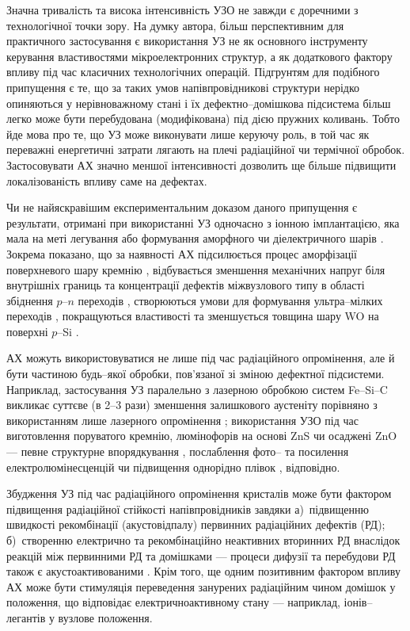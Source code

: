 Значна тривалість та висока інтенсивність УЗО не завжди є доречними з технологічної точки зору.
На думку автора, більш перспективним для практичного застосування є використання УЗ не як основного інструменту керування властивостями мікроелектронних структур, а як додаткового фактору впливу під час класичних технологічних операцій.
Підгрунтям для подібного припущення є те, що за таких умов напівпровідникові структури нерідко опиняються у нерівноважному стані і їх дефектно--домішкова підсистема більш легко може бути перебудована (модифікована) під дією пружних коливань.
Тобто йде мова про те, що УЗ може виконувати лише керуючу роль, в той час як переважні енергетичні затрати
лягають на плечі радіаційної чи термічної обробок.
Застосовувати АХ значно меншої інтенсивності дозволить ще більше підвищити локалізованість впливу саме на дефектах.

Чи не найяскравішим експериментальним доказом даного припущення є результати, отримані при
використанні УЗ одночасно з іонною імплантацією, яка мала на меті легування або формування аморфного чи діелектричного шарів \cite{US:ImplantUFJ2015,US:ImplantUFJ2001,US:ImplantUFJ2008,ROMANYUK2005,Roman2006,RomanyukSST,
YOlikh2005,ROMANJUK2005MatSci,USImplant:JVacSci}.
Зокрема показано, що за наявності АХ
підсилюється процес аморфізації поверхневого шару кремнію \cite{RomanyukSST,US:ImplantUFJ2001},
відбувається зменшення механічних напруг біля внутрішніх границь \cite{US:ImplantUFJ2008,ROMANJUK2005MatSci}
та концентрації дефектів міжвузлового типу в області збіднення $p$--$n$ переходів \cite{YOlikh2005},
створюються умови для формування ультра--мілких переходів \cite{USImplant:JVacSci},
покращуються властивості та зменшується товщина шару WO на поверхні $p$--Si \cite{ROMANYUK2005,Roman2006}.

АХ можуть використовуватися не лише під час радіаційного опромінення, але й бути частиною будь--якої обробки, пов'язаної зі зміною дефектної підсистеми.
Наприклад, застосування УЗ паралельно з лазерною обробкою систем Fe--Si--C викликає суттєве (в 2--3 рази) зменшення залишкового аустеніту порівняно з використанням лише лазерного опромінення \cite{US:FeSiC};
використання УЗО під час виготовлення поруватого кремнію, люмінофорів на основі ZnS чи осаджені ZnO --- певне структурне впорядкування \cite{Kalem2000}, послаблення фото-- та посилення електролюмінесценцій \cite{Wang:JLum} чи підвищення однорідно плівок \cite{US:ZnOfilm}, відповідно.



Збудження УЗ під час радіаційного опромінення кристалів може бути фактором підвищення радіаційної стійкості напівпровідників завдяки
а)~підвищенню швидкості рекомбінації (акустовідпалу) первинних радіаційних дефектів (РД);
б)~створенню електрично та рекомбінаційно неактивних вторинних РД внаслідок реакцій між первинними РД та домішками --- процеси дифузії та перебудови РД також є акустоактивованими \cite{YOlikh2006TPLr,Parchinskii2000r}.
Крім того, ще одним позитивним фактором впливу АХ може бути стимуляція переведення занурених радіаційним чином домішок у положення, що відповідає електричноактивному стану --- наприклад, іонів--легантів у вузлове положення.



